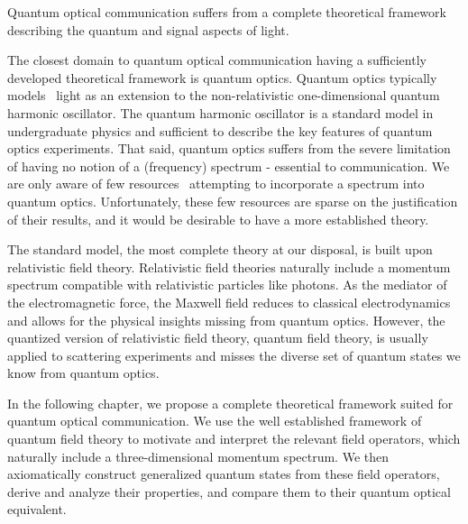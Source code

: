 Quantum optical communication suffers from a complete theoretical framework describing the quantum and signal aspects of light.

The closest domain to quantum optical communication having a sufficiently developed theoretical framework is quantum optics.
Quantum optics typically models~\cite{Fox2006,Gerry2005,Haroche2006,Meystre2007} light as an extension to the non-relativistic one-dimensional quantum harmonic oscillator.
The quantum harmonic oscillator is a standard model in undergraduate physics and sufficient to describe the key features of quantum optics experiments.
That said, quantum optics suffers from the severe limitation of having no notion of a (frequency) spectrum - essential to communication.
We are only aware of few resources~\cite{Barnett2002,Shapiro2009,Loudon2000} attempting to incorporate a spectrum into quantum optics.
Unfortunately, these few resources are sparse on the justification of their results, and it would be desirable to have a more established theory.

The standard model, the most complete theory at our disposal, is built upon relativistic field theory.
Relativistic field theories naturally include a momentum spectrum compatible with relativistic particles like photons.
As the mediator of the electromagnetic force, the Maxwell field reduces to classical electrodynamics and allows for the physical insights missing from quantum optics.
However, the quantized version of relativistic field theory, quantum field theory, is usually applied to scattering experiments and misses the diverse set of quantum states we know from quantum optics.

In the following chapter, we propose a complete theoretical framework suited for quantum optical communication.
We use the well established framework of quantum field theory to motivate and interpret the relevant field operators, which naturally include a three-dimensional momentum spectrum.
We then axiomatically construct generalized quantum states from these field operators, derive and analyze their properties, and compare them to their quantum optical equivalent.